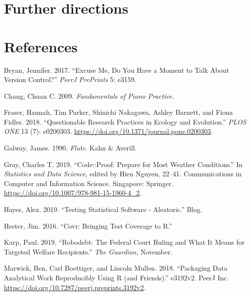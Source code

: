 \documentclass[
]{article}
\newlength{\cslhangindent}
\newenvironment{cslreferences}%
  {\setlength{\parindent}{0pt}%
  \everypar{\setlength{\hangindent}{\cslhangindent}}\ignorespaces}%
  {\par}
\begin{document}
\hypertarget{further-directions}{%
\section{Further directions}\label{further-directions}}

\hypertarget{references}{%
\section*{References}\label{references}}

\hypertarget{refs}{}
\begin{cslreferences}
\leavevmode\hypertarget{ref-Bryan2017ExcuseMD}{}%
Bryan, Jennifer. 2017. ``Excuse Me, Do You Have a Moment to Talk About
Version Control?'' \emph{PeerJ PrePrints} 5: e3159.

\leavevmode\hypertarget{ref-chang_fundamentalspianopractice_2009a}{}%
Chang, Chuan C. 2009. \emph{Fundamentals of Piano Practice}.

\leavevmode\hypertarget{ref-fraser_questionable_2018}{}%
Fraser, Hannah, Tim Parker, Shinichi Nakagawa, Ashley Barnett, and Fiona
Fidler. 2018. ``Questionable Research Practices in Ecology and
Evolution.'' \emph{PLOS ONE} 13 (7): e0200303.
\url{https://doi.org/10.1371/journal.pone.0200303}.

\leavevmode\hypertarget{ref-galway_flute_1990}{}%
Galway, James. 1990. \emph{Flute}. Kahn \& Averill.

\leavevmode\hypertarget{ref-grayCodeProofPrepare2019}{}%
Gray, Charles T. 2019. ``Code::Proof: Prepare for Most Weather
Conditions.'' In \emph{Statistics and Data Science}, edited by Hien
Nguyen, 22--41. Communications in Computer and Information Science.
Singapore: Springer. \url{https://doi.org/10.1007/978-981-15-1960-4_2}.

\leavevmode\hypertarget{ref-hayes_testing_2019}{}%
Hayes, Alex. 2019. ``Testing Statistical Software - Aleatoric.'' Blog.

\leavevmode\hypertarget{ref-hester_covr_2016}{}%
Hester, Jim. 2016. ``Covr: Bringing Test Coverage to R.''

\leavevmode\hypertarget{ref-karp_robodebtfederalcourt_2019}{}%
Karp, Paul. 2019. ``Robodebt: The Federal Court Ruling and What It Means
for Targeted Welfare Recipients.'' \emph{The Guardian}, November.

\leavevmode\hypertarget{ref-marwick_packaging_2018}{}%
Marwick, Ben, Carl Boettiger, and Lincoln Mullen. 2018. ``Packaging Data
Analytical Work Reproducibly Using R (and Friends).'' e3192v2. PeerJ
Inc. \url{https://doi.org/10.7287/peerj.preprints.3192v2}.


\end{cslreferences}
\end{document}

